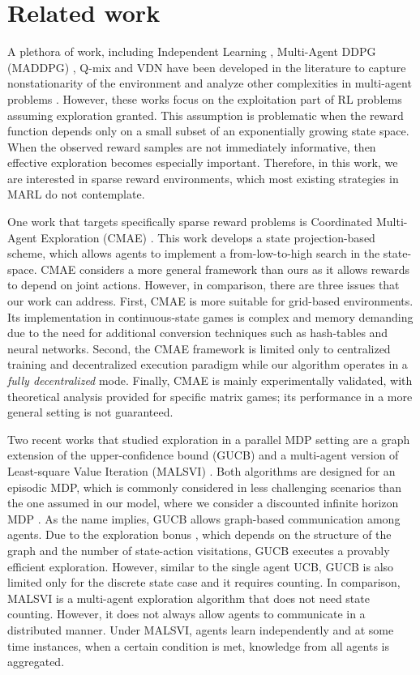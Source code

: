 \documentclass[lettersize,journal]{IEEEtran}
\begin{document}
\section{Related work}
\label{sec:literature}
A plethora of work, including  Independent Learning \cite{IL1}, Multi-Agent DDPG (MADDPG) \cite{MADDP},  Q-mix \cite{Q_mix} and VDN \cite{VDN} have been developed in the literature to capture nonstationarity of the environment and analyze other complexities in multi-agent problems \cite{IL1,MADDP,Q_mix,VDN}. However, these works focus on the exploitation part of RL problems assuming exploration granted. This assumption is problematic when the reward function depends only on a small subset of an exponentially growing state space.  When the observed reward samples are not immediately informative, then effective exploration becomes especially important. Therefore, in this work, we are interested in sparse reward environments, which most existing strategies in MARL do not contemplate. \par 
  One work that targets specifically sparse reward problems is Coordinated Multi-Agent Exploration (CMAE) \cite{CMAE}.   This work develops a state projection-based scheme, which allows agents to implement a from-low-to-high search in the state-space. CMAE considers a more general framework than ours as it allows rewards to depend on joint actions. However, in comparison, there are three issues that our work can address. First, CMAE is more suitable for grid-based environments. Its implementation in continuous-state games is complex and memory demanding due to the need for additional conversion techniques such as hash-tables and neural networks. Second, the CMAE framework is limited only to centralized training  and decentralized execution paradigm while our algorithm  operates in a {\em fully decentralized} mode. Finally, CMAE is mainly experimentally validated, with theoretical analysis provided for specific matrix games; its performance in a more general setting is not guaranteed.\par 
Two recent works that studied exploration in a parallel MDP setting are  a graph extension of the upper-confidence bound (GUCB) \cite{justin} and a multi-agent version of Least-square Value Iteration (MALSVI) \cite{LSVI_based}. Both algorithms are designed for an episodic MDP, which is commonly considered in less challenging scenarios than the one assumed in our model, where we consider a discounted infinite horizon MDP \cite{Inf_horizon,Inf_horizon2}. As the name implies, GUCB allows graph-based communication among agents. Due to the exploration bonus \cite{justin}, which depends on the structure of the graph and the number of state-action visitations, GUCB  executes a provably efficient exploration.  However, similar to the single agent UCB,  GUCB  is also limited only for the discrete state case and it requires counting. In comparison, MALSVI is  a multi-agent exploration algorithm that does not need state counting. However, it does not always allow agents to communicate in a distributed manner. Under MALSVI, agents learn independently and at some time instances, when a certain condition is met,  knowledge from all agents is aggregated. %
\end{document}

